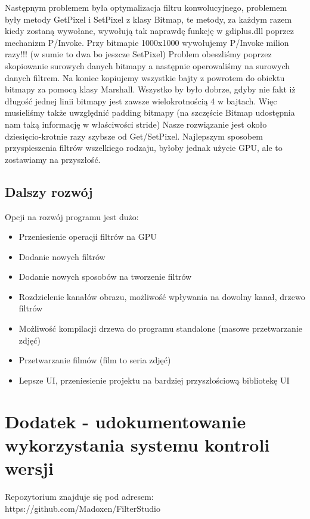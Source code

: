 \documentclass{article}
\begin{document}
Następnym problemem była optymalizacja filtru konwolucyjnego, problemem były metody GetPixel i SetPixel z klasy Bitmap,
te metody, za każdym razem kiedy zostaną wywołane, wywołują tak naprawdę funkcję w gdiplus.dll poprzez mechanizm P/Invoke.
Przy bitmapie 1000x1000 wywołujemy P/Invoke milion razy!!! (w sumie to dwa bo jeszcze SetPixel)
Problem obeszliśmy poprzez skopiowanie surowych danych bitmapy a następnie operowaliśmy na surowych danych filtrem.
Na koniec kopiujemy wszystkie bajty z powrotem do obiektu bitmapy za pomocą klasy Marshall.
Wszystko by było dobrze, gdyby nie fakt iż długość jednej linii bitmapy jest zawsze wielokrotnością 4 w bajtach.
Więc musieliśmy także uwzględnić padding bitmapy (na szczęście Bitmap udostępnia nam taką informację w właściwości stride)
Nasze rozwiązanie jest około dziesięcio-krotnie razy szybsze od Get/SetPixel.
Najlepszym sposobem przyspieszenia filtrów wszelkiego rodzaju, byłoby jednak użycie
GPU, ale to zostawiamy na przyszłość.



\subsection{Dalszy rozwój}
Opcji na rozwój programu jest dużo:
\begin{itemize}
    \item Przeniesienie operacji filtrów na GPU 
    \item Dodanie nowych filtrów
    \item Dodanie nowych sposobów na tworzenie filtrów
    \item Rozdzielenie kanałów obrazu, możliwość wpływania na dowolny kanał, drzewo filtrów
    \item Możliwość kompilacji drzewa do programu standalone (masowe przetwarzanie zdjęć)
    \item Przetwarzanie filmów (film to seria zdjęć)
    \item Lepsze UI, przeniesienie projektu na bardziej przyszłościową bibliotekę UI
\end{itemize}


\section{Dodatek - udokumentowanie wykorzystania systemu kontroli wersji}
Repozytorium znajduje się pod adresem: https://github.com/Madoxen/FilterStudio

\end{document}
